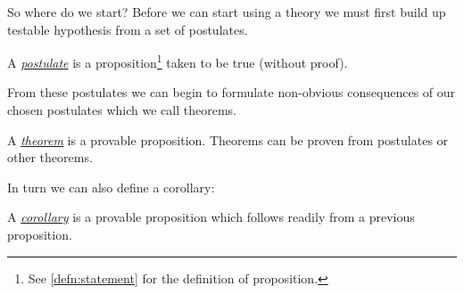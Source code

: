     So where do we start?
    Before we can start using a theory we must first build up testable hypothesis from a set of postulates.
    \begin{defn}
        A \underline{\emph{postulate}} is a proposition\footnote{See \vref{defn:statement} for the definition of proposition.} taken to be true (without proof).
    \end{defn}
    From these postulates we can begin to formulate non-obvious consequences of our chosen postulates which we call theorems.
    \begin{defn}
        A \underline{\emph{theorem}} is a provable proposition. Theorems can be proven from postulates or other theorems.
    \end{defn}
    In turn we can also define a corollary:
    \begin{defn}
        A \underline{\emph{corollary}} is a provable proposition which follows readily from a previous proposition.
    \end{defn}
    



    



    \lipsum
